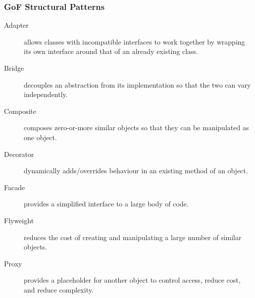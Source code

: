 \documentclass{beamer}
\begin{document}
\begin{frame}
\frametitle {GoF Structural Patterns}
\begin{small}
\begin{description}
 \item [Adapter] allows classes with incompatible interfaces to work together by wrapping its own interface around that of an already existing class.
 \item [Bridge] decouples an abstraction from its implementation so that the two can vary independently.
 \item [Composite] composes zero-or-more similar objects so that they can be manipulated as one object.
 \item [Decorator] dynamically adds/overrides behaviour in an existing method of an object.
 \item [Facade] provides a simplified interface to a large body of code.
 \item [Flyweight] reduces the cost of creating and manipulating a large number of similar objects.
 \item [Proxy] provides a placeholder for another object to control access, reduce cost, and reduce complexity.
\end{description}
\end{small}
\end{frame}
\end{document}

